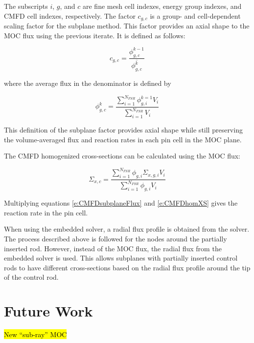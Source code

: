 The subscripts $i$, $g$, and $c$ are fine mesh cell indexes, energy group indexes, and CMFD cell indexes, respectively.  The factor $c_{g,c}$ is a group- and cell-dependent scaling factor for the subplane method.  This factor provides an axial shape to the MOC flux using the previous iterate.  It is defined as follows:

\begin{equation}\label{e:CMFDsubplaneFactor}
c_{g,c} = \frac{\phi^{k-1}_{g,c}}{\overline{\phi^k_{g,c}}}
\end{equation}

where the average flux in the denominator is defined by

\begin{equation}\label{e:CMFDaverageFlux}
\phi^k_{g,c} = \frac{\sum_{i=1}^{N_{FSR}} \phi^{k=1}_{g,i} V_i}{\sum_{i=1}^{N_{FSR}} V_i}
\end{equation}

This definition of the subplane factor provides axial shape while still preserving the volume-averaged flux and reaction rates in each pin cell in the MOC plane.

The CMFD homogenized cross-sections can be calculated using the MOC flux:

\begin{equation}\label{e:CMFDhomXS}
\Sigma_{x,c} = \frac{\sum_{i=1}^{N_{FSR}} \phi_{g,i}\Sigma_{x,g,i}V_i}{\sum_{i=1}^{N_{FSR}} \phi_{g,i}V_i}
\end{equation}

Multiplying equations \ref{e:CMFDsubplaneFlux} and \ref{e:CMFDhomXS} gives the reaction rate in the pin cell.

When using the embedded solver, a radial flux profile is obtained from the solver.  The process described above is followed for the nodes around the partially inserted rod.  However, instead of the MOC flux, the radial flux from the embedded solver is used.  This allows subplanes with partially inserted control rods to have different cross-sections based on the radial flux profile around the tip of the control rod.


\section{Future Work}

\hl{New ``sub-ray'' MOC}
